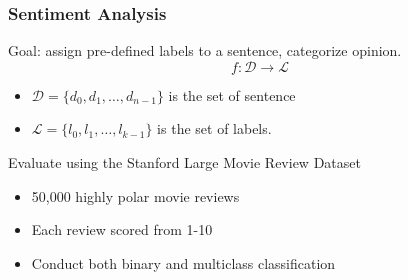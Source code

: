 \documentclass{beamer}
\begin{document}
\begin{frame}
\frametitle{Sentiment Analysis}
    Goal: assign pre-defined labels to a sentence, categorize opinion.
    $$f:\mathcal{D}\rightarrow\mathcal{L}$$
    \begin{itemize}
        \item $\mathcal{D}=\{d_0, d_1,\ldots, d_{n-1}\}$ is the set of sentence
        \item $\mathcal{L}=\{l_0, l_1,\ldots, l_{k-1}\}$ is the set of labels.
    \end{itemize}
    Evaluate using the Stanford Large Movie Review Dataset
    \begin{itemize}
        \item 50,000 highly polar movie reviews
        \item Each review scored from 1-10
        \item Conduct both binary and multiclass classification
    \end{itemize}
\end{frame}
\end{document}
